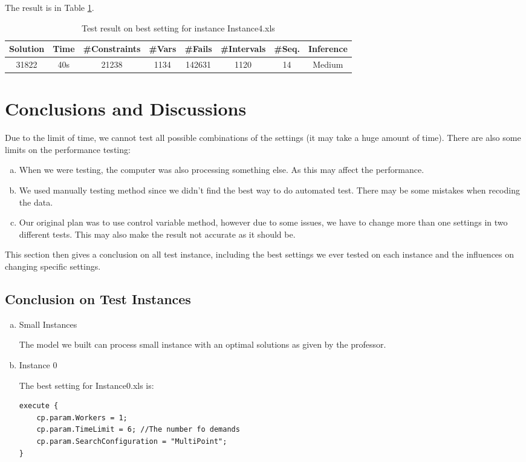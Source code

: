 \documentclass[a4paper, 12pt]{article}
\begin{document}
The result is in Table \ref{best4}. 

\begin{table}
    \centering
    \caption{Test result on best setting for instance Instance4.xls}
    \label{best4}
    \begin{tabular}{|c|c|c|c|c|c|c|c|}
        \hline
        Solution & Time & \#Constraints & \#Vars & \#Fails & \#Intervals & \#Seq. & Inference \\
        \hline
        31822 & 40s & 21238 & 1134 & 142631 & 1120 & 14 & Medium \\
        \hline
    \end{tabular}
\end{table}

\section{Conclusions and Discussions}

Due to the limit of time, we cannot test all possible combinations of the settings (it may take a huge amount of time). There are also some limits on the performance testing: 
\begin{enumerate}[a.~]
\item When we were testing, the computer was also processing something else. As this may affect the performance. 
\item We used manually testing method since we didn't find the best way to do automated test. There may be some mistakes when recoding the data. 
\item Our original plan was to use control variable method, however due to some issues, we have to change more than one settings in two different tests. This may also make the result not accurate as it should be. 
\end{enumerate}

This section then gives a conclusion on all test instance, including the best settings we ever tested on each instance and the influences on changing specific settings. 

\subsection{Conclusion on Test Instances}
\begin{enumerate}[a.~]
\item Small Instances

The model we built can process small instance with an optimal solutions as given by the professor. 

\item Instance 0

The best setting for Instance0.xls is: 
\begin{lstlisting}
execute {
    cp.param.Workers = 1;
    cp.param.TimeLimit = 6; //The number fo demands
    cp.param.SearchConfiguration = "MultiPoint";
}
\end{lstlisting}
\end{enumerate}
\end{document}
